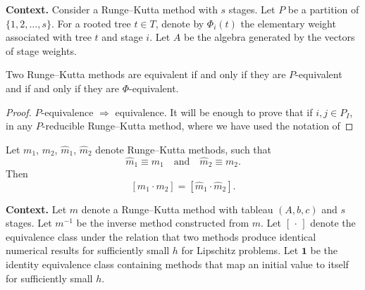 \noindent\textbf{Context.}
Consider a Runge--Kutta method with $s$ stages. Let $P$ be a partition of $\{1,2,\dots,s\}$. For a rooted tree $t \in T$, denote by $\Phi_i(t)$ the elementary weight associated with tree $t$ and stage $i$. Let $A$ be the algebra generated by the vectors of stage weights.

\begin{theorem}

  \label{thm:381H}
Two Runge--Kutta methods are equivalent if and only if they are $P$-equivalent and if and only if they are $\Phi$-equivalent.
\end{theorem}

\begin{proof}
$P$-equivalence $\Rightarrow$ equivalence. It will be enough to prove that if $i, j \in P_I$, in any $P$-reducible Runge--Kutta method, where we have used the notation of
\end{proof}

\begin{theorem}

  \label{thm:382A}
Let $m_1$, $m_2$, $\widehat{m}_1$, $\widehat{m}_2$ denote Runge--Kutta methods, such that
\[
\widehat{m}_1 \equiv m_1 \quad \text{and} \quad \widehat{m}_2 \equiv m_2. \tag{382f}
\]
Then
\[
[m_1 \cdot m_2] = [\widehat{m}_1 \cdot \widehat{m}_2].
\]
\end{theorem}

\noindent\textbf{Context.}
Let $m$ denote a Runge--Kutta method with tableau $(A,b,c)$ and $s$ stages.
Let $m^{-1}$ be the inverse method constructed from $m$.
Let $[\,\cdot\,]$ denote the equivalence class under the relation that two methods produce identical numerical results for sufficiently small $h$ for Lipschitz problems.
Let $\mathbf{1}$ be the identity equivalence class containing methods that map an initial value to itself for sufficiently small $h$.

